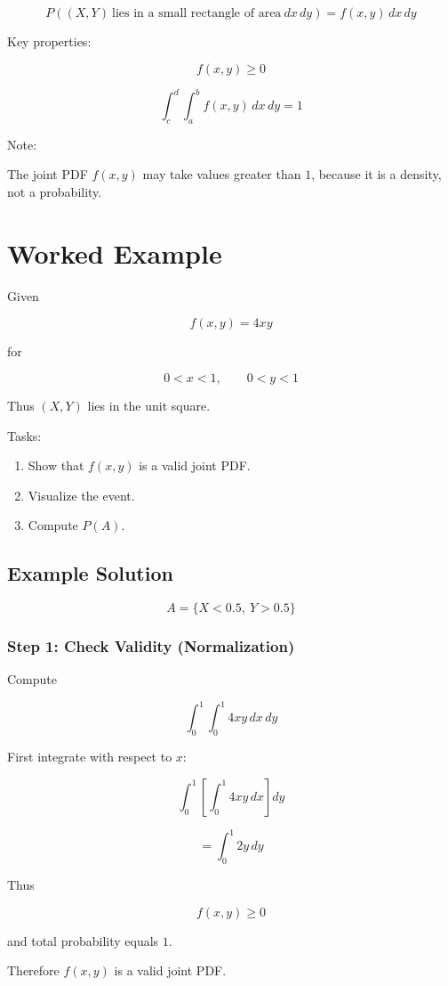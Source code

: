 \documentclass[11pt]{article}
\begin{document}
\[
P((X,Y)\ \text{lies in a small rectangle of area}\ dx\,dy)
= f(x,y)\,dx\,dy
\]

Key properties:

\[
f(x,y) \ge 0
\]

\[
\int_c^d \int_a^b f(x,y)\,dx\,dy = 1
\]

Note:

The joint PDF $f(x,y)$ may take values greater than $1$, because it is a density, not a probability.

\section{Worked Example}

Given

\[
f(x,y) = 4xy
\]

for

\[
0 < x < 1, \qquad 0 < y < 1
\]

Thus $(X,Y)$ lies in the unit square.

Tasks:
\begin{enumerate}[label=\arabic*.]
\item Show that $f(x,y)$ is a valid joint PDF.
\item Visualize the event.
\item Compute $P(A)$.
\end{enumerate}

\subsection*{Example Solution}

\[
A = \{X < 0.5,\ Y > 0.5\}
\]

\subsubsection*{Step 1: Check Validity (Normalization)}

Compute

\[
\int_0^1 \int_0^1 4xy\,dx\,dy
\]

First integrate with respect to $x$:

\[
\int_0^1 \left[\int_0^1 4xy\,dx\right] dy
\]

\[
= \int_0^1 2y\,dy
\]

Thus

\[
f(x,y) \ge 0
\]

and total probability equals $1$.

Therefore $f(x,y)$ is a valid joint PDF.
\end{document}

